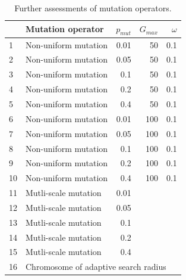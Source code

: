 \documentclass{ametsoc}
\begin{document}
\begin{table}[t]
	\caption{Further assessments of mutation operators.}
	\begin{center}
		\begin{tabular}{llrrr}
			\hline\hline  & \textbf{Mutation operator} & \textbf{$p_{mut}$} & \textbf{$G_{max}$} & \textbf{$\omega$}\\ 
			\hline 1 & Non-uniform mutation & 0.01 & 50 & 0.1 \\
			2 & Non-uniform mutation & 0.05 & 50 & 0.1 \\
			3 & Non-uniform mutation & 0.1 & 50 & 0.1 \\
			4 & Non-uniform mutation & 0.2 & 50 & 0.1 \\
			5 & Non-uniform mutation & 0.4 & 50 & 0.1 \\
			6 & Non-uniform mutation & 0.01 & 100 & 0.1 \\
			7 & Non-uniform mutation & 0.05 & 100 & 0.1 \\
			8 & Non-uniform mutation & 0.1 & 100 & 0.1 \\
			9 & Non-uniform mutation & 0.2 & 100 & 0.1 \\
			10 & Non-uniform mutation & 0.4 & 100 & 0.1 \\
			11 & Mutli-scale mutation &  0.01 &&\\
			12 & Mutli-scale mutation &  0.05 && \\
			13 & Mutli-scale mutation &  0.1 && \\
			14 & Mutli-scale mutation &  0.2 && \\
			15 & Mutli-scale mutation &  0.4 && \\
			16 & \multicolumn{4}{l}{Chromosome of adaptive search radius} \\
			\hline
		\end{tabular}
	\end{center}
	\label{tab:assessed_mutation_operators_bis}
\end{table}



%
\end{document}
